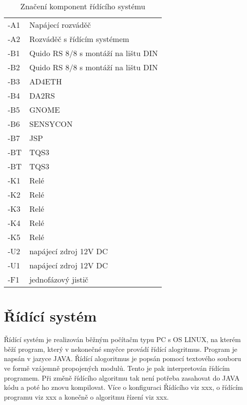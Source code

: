 \documentclass{book}
\begin{document}

\begin{table}[]
  \centering
    \begin{tabular}{l l}
      -A1 & Napájecí rozváděč\\
      -A2 & Rozváděč s řídícím systémem\\
      -B1 & Quido RS 8/8 s montáží na lištu DIN\\
      -B2 & Quido RS 8/8 s montáží na lištu DIN\\
      -B3 & AD4ETH\\
      -B4 & DA2RS\\
      -B5 & GNOME\\
      -B6 & SENSYCON\\
      -B7 & JSP\\
      -BT & TQS3\\
      -BT & TQS3\\
      -K1 & Relé\\
      -K2 & Relé\\
      -K3 & Relé\\
      -K4 & Relé\\
      -K5 & Relé\\
      -U2 & napájecí zdroj 12V DC\\
      -U1 & napájecí zdroj 12V DC\\
      -F1 & jednofázový jistič
    \end{tabular}
  \caption{Značení komponent řídícího systému}
  \label{tab:CSLabels}
\end{table}


\chapter{Řídící systém}

    Řídící systém je realizován běžným počítačm typu PC s OS LINUX, na kterém
    běží program, který v nekonečné smyčce provádí řídící alogritmus. Program
    je napsán v jazyce JAVA. Řídící alogoritmus je popsán pomocí textového
    souboru ve formě vzájemně propojených modulů. Tento je pak interpretován
    řídícím programem. Při změně řídícího algoritmu tak není potřeba zasahovat
    do JAVA kódu a poté ho znovu kompilovat. Více o konfiguraci Řídícího
    viz xxx, o řídícím programu viz xxx a konečně o algoritmu řízení viz xxx.
\end{document}
